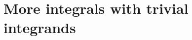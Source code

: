 \documentclass{xourse}
\begin{document}
\part{More integrals with trivial integrands}
\end{document}
